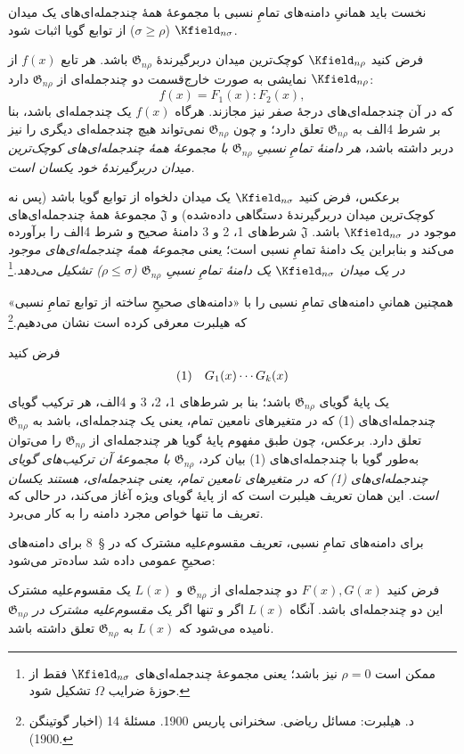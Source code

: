 \documentclass[11pt]{article}
\newcommand{\srcLTR}[1]{\relax\ifmmode\text{\mbox{\babelsublr{\foreignlanguage{english}{#1}}}}\else\babelsublr{\foreignlanguage{english}{#1}}\fi}
\newcommand{\srcfn}[2]{\begingroup\renewcommand{\thefootnote}{\srcLTR{#1}}\footnote{#2}\addtocounter{footnote}{-1}\endgroup}
\providecommand{\Gdom}{\mathfrak{G}}
\begin{document}
نخست باید همانیِ دامنه‌های تمامِ نسبی با مجموعهٔ همهٔ چندجمله‌ای‌های یک میدان $\Kfield_{n\sigma}$ ($\sigma\ge \rho$) از توابع گویا اثبات شود.

فرض کنید $\Kfield_{n\rho}$ کوچک‌ترین میدان دربرگیرندهٔ $\Gdom_{n\rho}$ باشد. هر تابع $f(x)$ از $\Kfield_{n\rho}$ نمایشی به صورت خارج‌قسمت دو چندجمله‌ای از $\Gdom_{n\rho}$ دارد:
\[
f(x)=F_1(x):F_2(x),
\]
که در آن چندجمله‌ای‌های درجهٔ صفر نیز مجازند. هرگاه $f(x)$ یک چندجمله‌ای باشد، بنا بر شرط 4الف به $\Gdom_{n\rho}$ تعلق دارد؛ و چون $\Gdom_{n\rho}$ نمی‌تواند هیچ چندجمله‌ای دیگری را نیز دربر داشته باشد، \emph{هر دامنهٔ تمامِ نسبیِ $\Gdom_{n\rho}$ با مجموعهٔ همهٔ چندجمله‌ای‌های کوچک‌ترین میدان دربرگیرندهٔ خود یکسان است.}

برعکس، فرض کنید $\Kfield_{n\sigma}$ یک میدان دلخواه از توابع گویا باشد (پس نه کوچک‌ترین میدان دربرگیرندهٔ دستگاهی داده‌شده) و $\mathfrak J$ مجموعهٔ همهٔ چندجمله‌ای‌های موجود در $\Kfield_{n\sigma}$ باشد. $\mathfrak J$ شرط‌های 1، 2 و 3 دامنهٔ صحیح و شرط 4الف را برآورده می‌کند و بنابراین یک دامنهٔ تمامِ نسبی است؛ یعنی \emph{مجموعهٔ همهٔ چندجمله‌ای‌های موجود در یک میدان $\Kfield_{n\sigma}$ یک دامنهٔ تمامِ نسبیِ $\Gdom_{n\rho}$ ($\rho\le\sigma$) تشکیل می‌دهد.}\srcfn{*)}{ممکن است $\rho=0$ نیز باشد؛ یعنی مجموعهٔ چندجمله‌ای‌های $\Kfield_{n\sigma}$ فقط از حوزهٔ ضرایب $\Omega$ تشکیل شود.}

همچنین همانیِ دامنه‌های تمامِ نسبی را با «دامنه‌های صحیحِ ساخته از توابع تمامِ نسبی» که هیلبرت معرفی کرده است نشان می‌دهیم.\srcfn{**)}{د. هیلبرت: مسائل ریاضی. سخنرانی پاریس 1900. مسئلهٔ 14 (اخبار گوتینگن 1900).}

فرض کنید
\[
\begin{array}{@{}l@{\quad}c@{}}
(1)& G_1(x)\cdots G_k(x)
\end{array}
\]
یک پایهٔ گویای $\Gdom_{n\rho}$ باشد؛ بنا بر شرط‌های 1، 2، 3 و 4الف، هر ترکیب گویای چندجمله‌ای‌های (1) که در متغیرهای نامعین تمام، یعنی یک چندجمله‌ای، باشد به $\Gdom_{n\rho}$ تعلق دارد. برعکس، چون طبق مفهوم پایهٔ گویا هر چندجمله‌ای از $\Gdom_{n\rho}$ را می‌توان به‌طور گویا با چندجمله‌ای‌های (1) بیان کرد، $\Gdom_{n\rho}$ \emph{با مجموعهٔ آن ترکیب‌های گویای چندجمله‌ای‌های (1) که در متغیرهای نامعین تمام، یعنی چندجمله‌ای، هستند یکسان است.} این همان تعریف هیلبرت است که از پایهٔ گویای ویژه آغاز می‌کند، در حالی که تعریف ما تنها خواص مجرد دامنه را به کار می‌برد.

برای دامنه‌های تمامِ نسبی، تعریف مقسوم‌علیه مشترک که در \S\ 8 برای دامنه‌های صحیحِ عمومی داده شد ساده‌تر می‌شود:

فرض کنید $F(x),G(x)$ دو چندجمله‌ای از $\Gdom_{n\rho}$ و $L(x)$ یک مقسوم‌علیه مشترک این دو چندجمله‌ای باشد. آنگاه $L(x)$ اگر و تنها اگر یک \emph{مقسوم‌علیه مشترک در $\Gdom_{n\rho}$} نامیده می‌شود که $L(x)$ به $\Gdom_{n\rho}$ تعلق داشته باشد.
\end{document}
